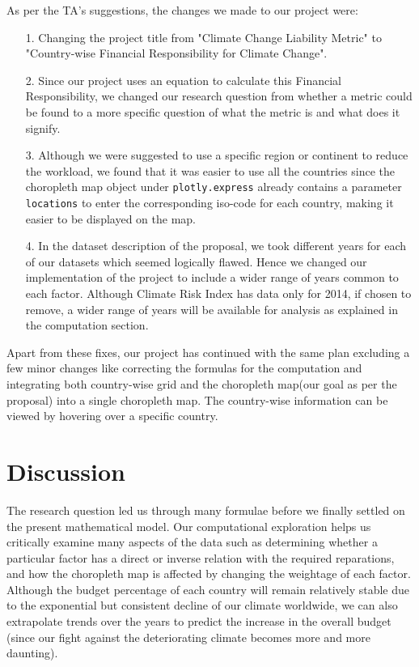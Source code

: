 \documentclass[fontsize=11pt]{article}
\begin{document}
    As per the TA's suggestions, the changes we made to our project were:
    \begin{enumerate}
        \item [1.] Changing the project title from "Climate Change Liability Metric" to "Country-wise Financial
                    Responsibility for Climate Change".
        \item [2.] Since our project uses an equation to calculate this Financial Responsibility, we changed our
                    research question from whether a metric could be found to a more specific question of what the
                    metric is and what does it signify.
        \item [3.] Although we were suggested to use a specific region or continent to reduce the workload, we found
                    that it was easier to use all the countries since the choropleth map object under \texttt{plotly.express}
                    already contains a parameter \texttt{locations} to enter the corresponding iso-code for each country,
                    making it easier to be displayed on the map.
        \item [4.] In the dataset description of the proposal, we took different years for each of our datasets which seemed logically flawed.
                    Hence we changed our implementation of the project to include a wider range of years common to each
                    factor. Although Climate Risk Index has data only for 2014, if chosen to remove, a wider range of
                    years will be available for analysis as explained in the computation section.
    \end{enumerate}
    Apart from these fixes, our project has continued with the same plan excluding a few minor changes like correcting the
    formulas for the computation and integrating both country-wise grid and the choropleth map(our goal as per the proposal)
    into a single choropleth map. The country-wise information can be viewed by hovering over a specific country. \newline
    
    \section*{Discussion}
    \quad The research question led us through many formulae before we finally settled on the present mathematical model. 
    Our computational exploration helps us critically examine many aspects of the data such as determining whether a particular factor 
    has a direct or inverse relation with the required reparations, and how the choropleth map is affected by changing the weightage of each factor. 
    Although the budget percentage of each country will remain relatively stable due to the exponential but consistent decline of our climate worldwide, 
    we can also extrapolate trends over the years to predict the increase in the overall budget (since our fight against the deteriorating climate 
    becomes more and more daunting).
    \newline
    
\end{document}
